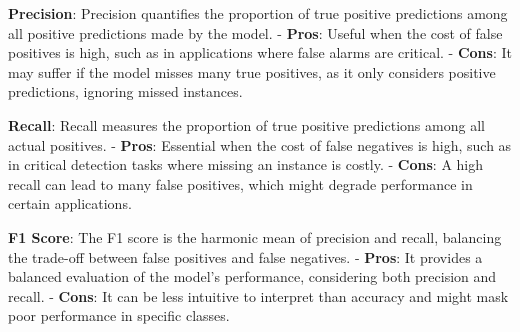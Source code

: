 \textbf{Precision}: Precision quantifies the proportion of true positive predictions among all positive predictions made by the model. 
- \textbf{Pros}: Useful when the cost of false positives is high, such as in applications where false alarms are critical.
- \textbf{Cons}: It may suffer if the model misses many true positives, as it only considers positive predictions, ignoring missed instances.

\textbf{Recall}: Recall measures the proportion of true positive predictions among all actual positives. 
- \textbf{Pros}: Essential when the cost of false negatives is high, such as in critical detection tasks where missing an instance is costly. 
- \textbf{Cons}: A high recall can lead to many false positives, which might degrade performance in certain applications.

\textbf{F1 Score}: The F1 score is the harmonic mean of precision and recall, balancing the trade-off between false positives and false negatives. 
- \textbf{Pros}: It provides a balanced evaluation of the model's performance, considering both precision and recall. 
- \textbf{Cons}: It can be less intuitive to interpret than accuracy and might mask poor performance in specific classes.
